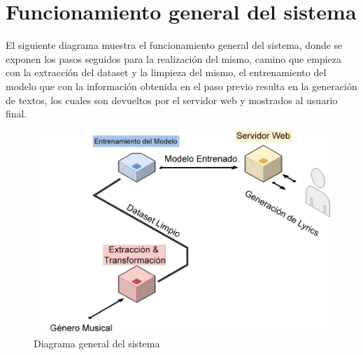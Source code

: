 \documentclass[12pt, a4paper, titlepage]{article}
\begin{document}
	\section{Funcionamiento general del sistema}
	El siguiente diagrama muestra el funcionamiento general del sistema, donde se exponen los pasos seguidos para la realización del mismo, camino que empieza con la extracción del dataset y la limpieza del mismo, el entrenamiento del modelo que con la información obtenida en el paso previo resulta en la generación de textos, los cuales son devueltos por el servidor web y mostrados al usuario final.
	\begin{figure}[H] 
		\includegraphics[width=13.5cm]{./Imagenes/Diagramas/general.png}
		\centering \caption{Diagrama general del sistema}
	\end{figure}
	\newpage
\end{document}
